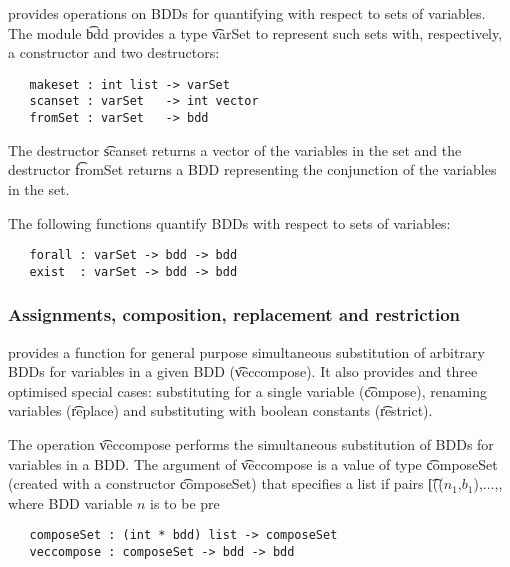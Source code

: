 \Buddy{} provides operations on BDDs for quantifying with respect to sets
of variables. The module  \t{bdd} provides a type \t{varSet} to represent such
sets with, respectively, a constructor and two destructors:

\begin{verbatim}
   makeset : int list -> varSet
   scanset : varSet   -> int vector
   fromSet : varSet   -> bdd
\end{verbatim}

The destructor \t{scanset} returns a vector of the variables in the
set and the destructor \t{fromSet} returns a BDD representing the
conjunction of the variables in the set.

The following functions quantify BDDs with respect to sets of variables:

\begin{verbatim}
   forall : varSet -> bdd -> bdd
   exist  : varSet -> bdd -> bdd
\end{verbatim}

\subsubsection{Assignments, composition, replacement and restriction}\label{replace}

\Muddy{} provides a function for general purpose simultaneous
substitution of arbitrary BDDs for variables in a given BDD (\t{veccompose}). It also
provides and three optimised special cases: substituting for a single
variable (\t{compose}), renaming variables (\t{replace}) and
substituting with boolean constants (\t{restrict}).

The operation \t{veccompose} performs the simultaneous substitution 
of BDDs for variables in a BDD. The argument of \t{veccompose}
is a value of type \t{composeSet}
(created with a constructor \t{composeSet})
that specifies a list if pairs \t[(($n_1$,$b_1$),$\ldots$,, where BDD variable $n$ is to be pre

\begin{verbatim}
   composeSet : (int * bdd) list -> composeSet
   veccompose : composeSet -> bdd -> bdd
\end{verbatim}

